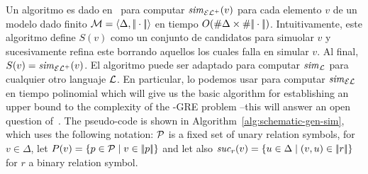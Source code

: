 Un algoritmo es dado en~\cite{HHK95} para computar ${\it sim}_{{\mathcal{EL}^+}}(v)$ para cada
elemento $v$ de un modelo dado finito
$\mathcal{M}=\langle \Delta,|\!|\cdot|\!| \rangle$
en tiempo $O(\# \Delta\times\# {|\!|\cdot|\!|})$.
Intuitivamente, este algoritmo
define $S(v)$ como un conjunto de candidatos para simuolar $v$ y
sucesivamente refina este borrando aquellos los cuales falla en simular $v$.
Al final, $S(v)={\it sim}_{\mathcal{EL}^+}(v)$. El algoritmo puede ser adaptado para
computar ${\it sim}_{\mathcal{L}}$ para cualquier otro languaje $\mathcal{L}$. En particular,
lo podemos usar para computar ${\it sim}_\mathcal{EL}$ en tiempo polinomial which will
give us the basic algorithm for establishing an upper bound to the
complexity of the \EL-GRE problem --this will answer an open
question of~\cite{AKS08}. The pseudo-code is shown in
Algorithm~\ref{alg:schematic-gen-sim}, which uses the following
notation: $\mathcal{P}$ is a fixed set of unary relation symbols,  for $v\in
\Delta$, let $P(v)=\{p\in\mathcal{P}\mid v\in|\!|p|\!|\}$ and let also
${\it suc}_{r}(v)=\{u\in\Delta\mid(v,u)\in|\!|r|\!|\}$ for $r$ a binary
relation symbol.